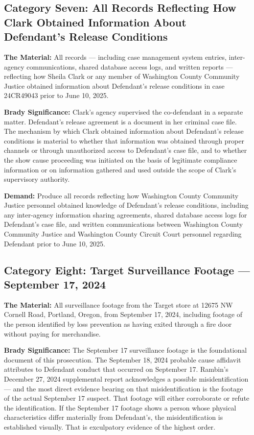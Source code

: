 \documentclass[12pt,letterpaper]{extarticle}
\begin{document}
\subsection{Category Seven: All Records Reflecting How Clark Obtained Information
About Defendant's Release Conditions}

\textbf{The Material:} All records --- including case management system entries,
inter-agency communications, shared database access logs, and written reports ---
reflecting how Sheila Clark or any member of Washington County Community Justice
obtained information about Defendant's release conditions in case 24CR49043 prior
to June 10, 2025.

\textbf{Brady Significance:} Clark's agency supervised the co-defendant in a
separate matter. Defendant's release agreement is a document in her criminal case
file. The mechanism by which Clark obtained information about Defendant's release
conditions is material to whether that information was obtained through proper
channels or through unauthorized access to Defendant's case file, and to whether
the show cause proceeding was initiated on the basis of legitimate compliance
information or on information gathered and used outside the scope of Clark's
supervisory authority.

\textbf{Demand:} Produce all records reflecting how Washington County Community
Justice personnel obtained knowledge of Defendant's release conditions, including
any inter-agency information sharing agreements, shared database access logs for
Defendant's case file, and written communications between Washington County
Community Justice and Washington County Circuit Court personnel regarding Defendant
prior to June 10, 2025.

\subsection{Category Eight: Target Surveillance Footage --- September 17, 2024}

\textbf{The Material:} All surveillance footage from the Target store at 12675 NW
Cornell Road, Portland, Oregon, from September 17, 2024, including footage of the
person identified by loss prevention as having exited through a fire door without
paying for merchandise.

\textbf{Brady Significance:} The September 17 surveillance footage is the
foundational document of this prosecution. The September 18, 2024 probable cause
affidavit attributes to Defendant conduct that occurred on September 17. Rambin's
December 27, 2024 supplemental report acknowledges a possible misidentification ---
and the most direct evidence bearing on that misidentification is the footage of
the actual September 17 suspect. That footage will either corroborate or refute the
identification. If the September 17 footage shows a person whose physical
characteristics differ materially from Defendant's, the misidentification is
established visually. That is exculpatory evidence of the highest order.
\end{document}

